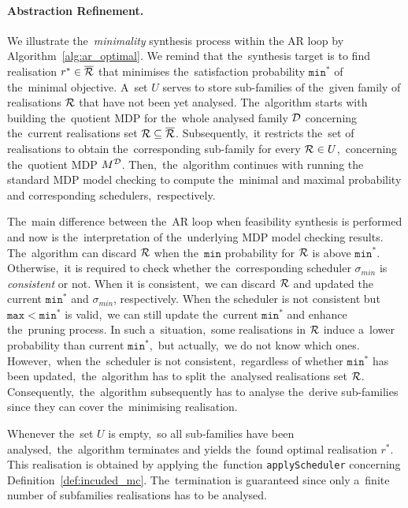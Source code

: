 \paragraph{Abstraction Refinement.}
We illustrate the~\textit{minimality} synthesis process within the AR loop by Algorithm~\ref{alg:ar_optimal}.
We remind that the~synthesis target is to find realisation $r^* \in \overline{\mathcal{R}}$ that minimises the~satisfaction probability $\mathtt{min^*}$ of the~minimal objective.
A~set $U$ serves to store sub-families of the~given family of realisations $\mathcal{R}$ that have not been yet analysed.
The~algorithm starts with building the~quotient MDP for the~whole analysed family $\mathcal{D}$ concerning the~current realisations set $\mathcal{R} \subseteq \overline{\mathcal{R}}$.
Subsequently,~it restricts the~set of realisations to obtain the~corresponding sub-family for every $\mathcal{R} \in U$,~concerning the~quotient MDP $M^{\mathcal{D}}$. 
Then,~the~algorithm continues with running the standard MDP model checking to compute the~minimal and maximal probability and corresponding schedulers,~respectively.

The~main difference between the~AR loop when feasibility synthesis is performed and now is the~interpretation of the~underlying MDP model checking results.
The~algorithm can discard $\mathcal{R}$ when the~$\mathtt{min}$ probability for $\mathcal{R}$ is above $\mathtt{min^*}$.
Otherwise,~it is required to check whether the~corresponding scheduler $\sigma_{min}$ is \textit{consistent} or not.
When it is consistent,~we can discard $\mathcal{R}$ and updated the current $\mathtt{min^*}$ and $\sigma_{min}$, respectively.
When the scheduler is not consistent but $\mathtt{max < min^*}$ is valid,~we can still update the~current $\mathtt{min^*}$ and enhance the~pruning process.
In such a~situation,~some realisations in $\mathcal{R}$ induce a~lower probability than current $\mathtt{min^*}$,~but actually,~we do not know which ones.
However,~when the~scheduler is not consistent,~regardless of whether $\mathtt{min^*}$ has been updated,~the~algorithm has to split the~analysed realisations set $\mathcal{R}$.
Consequently,~the~algorithm subsequently has to analyse the~derive sub-families since they can cover the~minimising realisation.

Whenever the~set $U$ is empty,~so all sub-families have been analysed,~the~algorithm terminates and yields the~found optimal realisation $r^*$.
This realisation is obtained by applying the~function \texttt{applyScheduler} concerning Definition~\ref{def:incuded_mc}.
The~termination is guaranteed since only a~finite number of subfamilies realisations has to be analysed.

